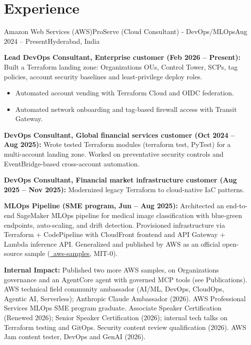 \section{\textbf{Experience}}
\resumeSubHeadingListStart

\resumeExp
{Amazon Web Services (AWS)}{ProServe (Cloud Consultant) - DevOps/MLOps}{Aug 2024 -- Present}{Hyderabad, India}
\resumeItemListStart
    \item[$\diamond$] \textbf{Lead DevOps Consultant, Enterprise customer (Feb 2026 -- Present):} Built a Terraform landing zone: Organizations OUs, Control Tower, SCPs, tag policies, account security baselines and least-privilege deploy roles.
    \begin{itemize}[leftmargin=2.5ex, noitemsep, topsep=0pt, labelsep=1.2mm]
        \item[$\circ$] Automated account vending with Terraform Cloud and OIDC federation.
        \item[$\circ$] Automated network onboarding and tag-based firewall access with Transit Gateway.
    \end{itemize}
    \item[$\diamond$] \textbf{DevOps Consultant, Global financial services customer (Oct 2024 -- Aug 2025):} Wrote tested Terraform modules (terraform test, PyTest) for a multi-account landing zone. Worked on preventative security controls and EventBridge-based cross-account automation.
    \item[$\diamond$] \textbf{DevOps Consultant, Financial market infrastructure customer (Aug 2025 -- Nov 2025):} Modernized legacy Terraform to cloud-native IaC patterns.
    \item[$\diamond$] \textbf{MLOps Pipeline (SME program, Jun -- Aug 2025):} Architected an end-to-end SageMaker MLOps pipeline for medical image classification with blue-green endpoints, auto-scaling, and drift detection. Provisioned infrastructure via Terraform + CodePipeline with CloudFront frontend and API Gateway + Lambda inference API. Generalized and published by AWS as an official open-source sample (\href{https://github.com/aws-samples/sample-sagemaker-image-classification-mlops}{\faGithub\ aws-samples}, MIT-0).
    \item[$\diamond$] \textbf{Internal Impact:} Published two more AWS samples, on Organizations governance and an AgentCore agent with governed MCP tools (see Publications). AWS technical field community ambassador (AI/ML, DevOps, CloudOps, Agentic AI, Serverless); Anthropic Claude Ambassador (2026). AWS Professional Services MLOps SME program graduate. Associate Speaker Certification (Renewed 2026); Senior Speaker Certification (2026); internal tech talks on Terraform testing and GitOps. Security content review qualification (2026). AWS Jam content tester, DevOps and GenAI (2026).
\resumeItemListEnd

